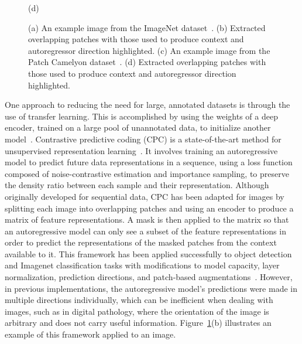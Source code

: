 \begin{figure}
\begin{minipage}[b]{.4\linewidth}
		\centerline{(d)}\medskip
	\end{minipage}
	\caption{(a) An example image from the ImageNet dataset~\citep{deng2009imagenet}. (b) Extracted overlapping patches with those used to produce context and autoregressor direction highlighted. (c) An example image from the Patch Camelyon dataset~\citep{veeling2018rotation}. (d) Extracted overlapping patches with those used to produce context and autoregressor direction highlighted.}
	\label{fig:example_cpc_patches}
\end{figure}

One approach to reducing the need for large, annotated datasets is through the use of transfer learning. This is accomplished by using the weights of a deep encoder, trained on a large pool of unannotated data, to initialize another model~\citep{weiss2016survey}. Contrastive predictive coding (CPC) is a state-of-the-art method for unsupervised representation learning~\citep{oord2018representation}. It involves training an autoregressive model to predict future data representations in a sequence, using a loss function composed of noise-contrastive estimation and importance sampling, to preserve the density ratio between each sample and their representation. Although originally developed for sequential data, CPC has been adapted for images by splitting each image into overlapping patches and using an encoder to produce a matrix of feature representations. A mask is then applied to the matrix so that an autoregressive model can only see a subset of the feature representations in order to predict the representations of the masked patches from the context available to it. This framework has been applied successfully to object detection and Imagenet classification tasks with modifications to model capacity, layer normalization, prediction directions, and patch-based augmentations~\citep{henaff2019data}. However, in previous implementations, the autoregressive model’s predictions were made in multiple directions individually, which can be inefficient when dealing with images, such as in digital pathology, where the orientation of the image is arbitrary and does not carry useful information. Figure~\ref{fig:example_cpc_patches}(b) illustrates an example of this framework applied to an image.

